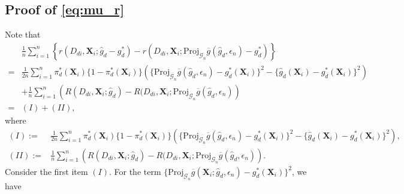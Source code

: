 \documentclass[11pt]{article}
\numberwithin{equation}{section}
\begin{document}
\subsection{Proof of \eqref{eq:mu_r}}\label{proof:eq:mu_r}
Note that
\begin{align*}
	&\frac{1}{n}\sum_{i=1}^n\left\{r(D_{di},\boldsymbol{X}_{i};\widehat{g}_d-g^*_d)-r(D_{di},\boldsymbol{X}_{i};\text{Proj}_{\mathcal{G}_n}\overline{g}(\widehat{g}_d,\epsilon_n)-g^*_d)\right\}\\
	=&\frac{1}{2n}\sum_{i=1}^n \pi_d^*(\boldsymbol{X}_i)\{1-\pi_d^*(\boldsymbol{X}_i)\}\left(\{\text{Proj}_{\mathcal{G}_n}\overline{g}(\widehat{g}_d,\epsilon_n)-g^*_d(\boldsymbol{X}_{i}) \}^2-\{\widehat{g}_d(\boldsymbol{X}_{i})-g^*_d(\boldsymbol{X}_{i}) \}^2\right)\\
	&+\frac{1}{n}\sum_{i=1}^n\left(R(D_{di},\boldsymbol{X}_{i};\widehat{g}_d)-R(D_{di},\boldsymbol{X}_{i};\text{Proj}_{\mathcal{G}_n}\overline{g}(\widehat{g}_d,\epsilon_n)\right)\\
	=&(I)+(II),
\end{align*}
where
\begin{align*}
	(I):=&\frac{1}{2n}\sum_{i=1}^n \pi_d^*(\boldsymbol{X}_i)\{1-\pi_d^*(\boldsymbol{X}_i)\}\left(\{\text{Proj}_{\mathcal{G}_n}\overline{g}(\widehat{g}_d,\epsilon_n)-g^*_d(\boldsymbol{X}_{i}) \}^2-\{\widehat{g}_d(\boldsymbol{X}_{i})-g^*_d(\boldsymbol{X}_{i}) \}^2\right),\\
	(II):=&\frac{1}{n}\sum_{i=1}^n\left(R(D_{di},\boldsymbol{X}_{i};\widehat{g}_d)-R(D_{di},\boldsymbol{X}_{i};\text{Proj}_{\mathcal{G}_n}\overline{g}(\widehat{g}_d,\epsilon_n)\right).
\end{align*}
Consider the  first item $(I)$. For the term $\{\text{Proj}_{\mathcal{G}_n}\overline{g}(\boldsymbol{X}_{i};\widehat{g}_d,\epsilon_n)-g^*_d(\boldsymbol{X}_{i})\}^2$, we have
\end{document}
